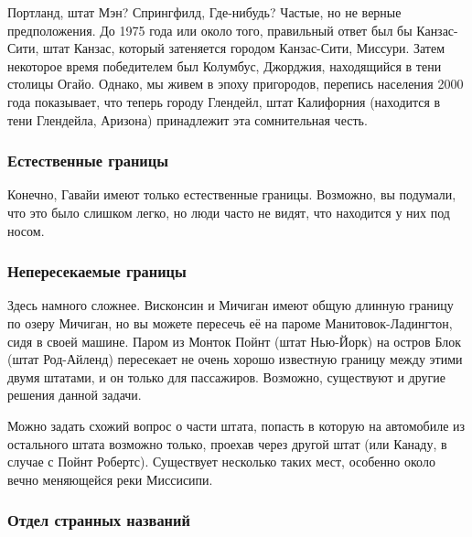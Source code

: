 Портланд, штат Мэн? Спрингфилд, Где-нибудь? 
Частые, но не верные предположения.
До 1975 года или около того, правильный ответ был бы Канзас-Сити, штат Канзас, который затеняется городом Канзас-Сити, Миссури.
Затем некоторое время победителем был Колумбус, Джорджия, находящийся в тени столицы Огайо. Однако, мы живем в эпоху пригородов, %
перепись населения 2000 года показывает, что теперь городу Глендейл, штат Калифорния (находится в тени Глендейла, Аризона) принадлежит эта сомнительная %
честь.\heart




\subsubsection*{Естественные границы}%


Конечно, Гавайи имеют только естественные границы. Возможно, вы подумали, что это было слишком легко, но люди часто не видят, что находится у них под носом. 
\heart




\subsubsection*{Непересекаемые границы}%


Здесь намного сложнее. Висконсин и Мичиган имеют общую длинную границу по озеру Мичиган, но вы можете пересечь её на пароме Манитовок-Ладингтон, сидя в своей машине. Паром из Монток Пойнт %
(штат Нью-Йорк) на остров Блок %
(штат Род-Айленд) пересекает не очень хорошо известную границу между этими двумя штатами, и он только для пассажиров. 
Возможно, существуют и другие решения данной задачи.\heart
                             


Можно задать схожий вопрос о части штата, попасть в которую на автомобиле из остального штата возможно только, проехав через другой штат (или Канаду, в случае с 
Пойнт Робертс). %
Существует несколько таких мест, особенно около вечно меняющейся реки Миссисипи.




\subsubsection*{Отдел странных названий}%


